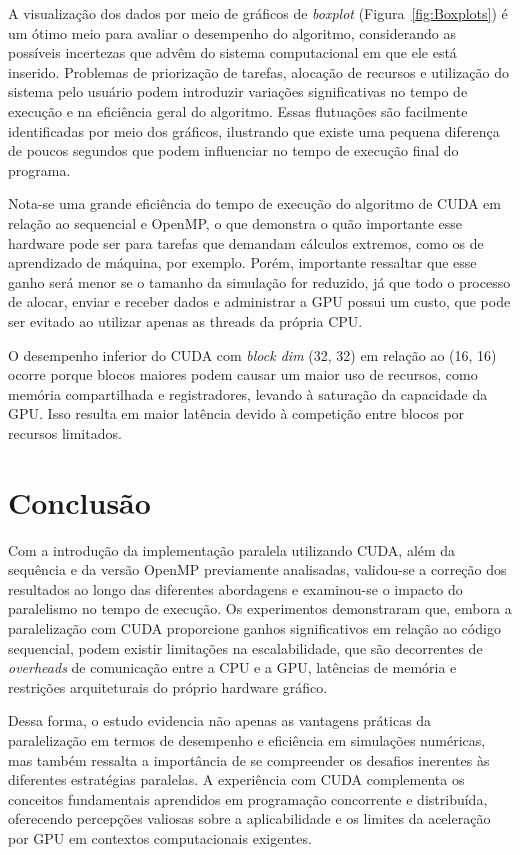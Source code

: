 \documentclass[12pt]{article}
\begin{document}
A visualização dos dados por meio de gráficos de \textit{boxplot}
(Figura~\ref{fig:Boxplots}) é um ótimo meio para avaliar o desempenho do
algoritmo, considerando as possíveis incertezas que advêm do sistema
computacional em que ele está inserido. Problemas de priorização de tarefas,
alocação de recursos e utilização do sistema pelo usuário podem introduzir
variações significativas no tempo de execução e na eficiência geral do
algoritmo. Essas flutuações são facilmente identificadas por meio dos gráficos,
ilustrando que existe uma pequena diferença de poucos segundos que podem
influenciar no tempo de execução final do programa.

Nota-se uma grande eficiência do tempo de execução do algoritmo de CUDA em
relação ao sequencial e OpenMP, o que demonstra o quão importante esse hardware
pode ser para tarefas que demandam cálculos extremos, como os de aprendizado de
máquina, por exemplo. Porém, importante ressaltar que esse ganho será menor se
o tamanho da simulação for reduzido, já que todo o processo de alocar, enviar e
receber dados e administrar a GPU possui um custo, que pode ser evitado ao
utilizar apenas as threads da própria CPU\@.

O desempenho inferior do CUDA com \textit{block dim} (32, 32) em relação ao
(16, 16) ocorre porque blocos maiores podem causar um maior uso de recursos,
como memória compartilhada e registradores, levando à saturação da capacidade
da GPU\@. Isso resulta em maior latência devido à competição entre blocos por
recursos limitados.

\section{Conclusão}

Com a introdução da implementação paralela utilizando CUDA, além da sequência e
da versão OpenMP previamente analisadas, validou-se a correção dos resultados
ao longo das diferentes abordagens e examinou-se o impacto do paralelismo no
tempo de execução. Os experimentos demonstraram que, embora a paralelização com
CUDA proporcione ganhos significativos em relação ao código sequencial, podem
existir limitações na escalabilidade, que são decorrentes de \textit{overheads}
de comunicação entre a CPU e a GPU, latências de memória e restrições
arquiteturais do próprio hardware gráfico.

Dessa forma, o estudo evidencia não apenas as vantagens práticas da
paralelização em termos de desempenho e eficiência em simulações numéricas, mas
também ressalta a importância de se compreender os desafios inerentes às
diferentes estratégias paralelas. A experiência com CUDA complementa os
conceitos fundamentais aprendidos em programação concorrente e distribuída,
oferecendo percepções valiosas sobre a aplicabilidade e os limites da
aceleração por GPU em contextos computacionais exigentes.



\nocite{*}
\end{document}
